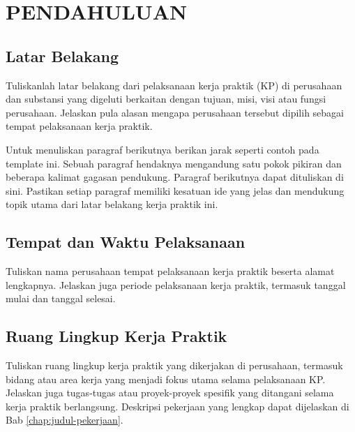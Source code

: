 \cleardoublepage %
\chapter{PENDAHULUAN}
\label{chap:pendahuluan}
\section{Latar Belakang}
\label{sec:latar_belakang}
Tuliskanlah latar belakang dari pelaksanaan kerja praktik (KP) di perusahaan dan substansi yang digeluti berkaitan dengan tujuan, misi, visi atau fungsi perusahaan. Jelaskan pula alasan mengapa perusahaan tersebut dipilih sebagai tempat pelaksanaan kerja praktik.

Untuk menuliskan paragraf berikutnya berikan jarak seperti contoh pada template ini. Sebuah paragraf hendaknya mengandung satu pokok pikiran dan beberapa kalimat gagasan pendukung.
Paragraf berikutnya dapat dituliskan di sini. Pastikan setiap paragraf memiliki kesatuan ide yang jelas dan mendukung topik utama dari latar belakang kerja praktik ini.

\section{Tempat dan Waktu Pelaksanaan}
\label{sec:tempat_waktu}
Tuliskan nama perusahaan tempat pelaksanaan kerja praktik beserta alamat lengkapnya. Jelaskan juga periode pelaksanaan kerja praktik, termasuk tanggal mulai dan tanggal selesai.

\section{Ruang Lingkup Kerja Praktik}
Tuliskan ruang lingkup kerja praktik yang dikerjakan di perusahaan, termasuk bidang atau area kerja yang menjadi fokus utama selama pelaksanaan KP. Jelaskan juga tugas-tugas atau proyek-proyek spesifik yang ditangani selama kerja praktik berlangsung.
Deskripsi pekerjaan yang lengkap dapat dijelaskan di Bab \ref{chap:judul-pekerjaan}.

